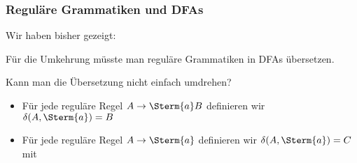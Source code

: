 \documentclass[aspectratio=1610,onlymath]{beamer}
\begin{document}
\begin{frame}\frametitle{Reguläre Grammatiken und DFAs}

Wir haben bisher gezeigt:


Für die Umkehrung müsste man reguläre Grammatiken in DFAs übersetzen.
\bigskip\pause

Kann man die Übersetzung nicht einfach umdrehen?
\begin{itemize}
\item Für jede reguläre Regel $A\to\Sterm{a}B$ definieren wir $\delta(A,\Sterm{a})=B$
\item Für jede reguläre Regel $A\to\Sterm{a}$ definieren wir $\delta(A,\Sterm{a})=C$ mit 
\end{itemize}

% 

\end{frame}
\end{document}
